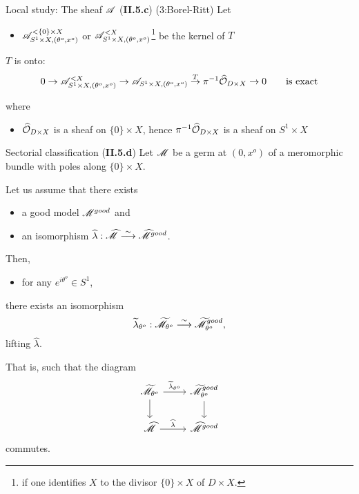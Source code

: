\begin{frame}[t]{Local study: The sheaf $\mathscr{A}$ (\textbf{II.5.c}) (3:Borel-Ritt)}
  Let
  \begin{itemize}
    \item $\mathscr{A}_{S^1\times X,(\theta^o,x^o)}^{<\{0\}\times X}$ or
      $\mathscr{A}_{S^1\times X,(\theta^o,x^o)}^{<X}$\footnote{if one identifies $X$ to
      the divisor $\{0\}\times X$ of $D\times X$.} be the kernel of $T$
  \end{itemize}
  \begin{lem}
    $T$ is onto:
    \[
      0 \to              \mathscr{A}_{S^1\times X,(\theta^o,x^o)}^{<X}
        \to              \mathscr{A}_{S^1\times X,(\theta^o,x^o)}
        \overset{T}{\to} \pi^{-1}\widehat{\mathcal{O}}_{D\times X}
        \to 0
        \qquad
        \text{is exact}
    \]
  \end{lem}
  where
  \begin{itemize}
    \item $\widehat{\mathcal{O}}_{D\times X}$ is a sheaf on $\{0\}\times X$, hence
      $\pi^{-1}\widehat{\mathcal{O}}_{D\times X}$ is a sheaf on $S^1\times X$
  \end{itemize}
\end{frame}

\begin{frame}[fragile]{Sectorial classification (\textbf{II.5.d})}
  Let $\mathscr{M}$ be a germ at $(0,x^o)$ of a meromorphic bundle with poles along
  $\{0\}\times X$.
  \begin{thm}[II.5.12]
    Let us assume that there exists
    \begin{itemize}
      \item a good model $\mathscr{M}^{good}$ and
      \item an isomorphism $\widehat\lambda: \widehat{\mathscr{M}}
        \overset{\sim}{\longrightarrow}\widehat{\mathscr{M}}^{good}$.
    \end{itemize}
    Then,
    \begin{itemize}
      \item for any $e^{i\theta^o}\in S^1$,
    \end{itemize}
    there exists an isomorphism
    \[
      \widetilde\lambda_{\theta^o}: \widetilde{\mathscr{M}}_{\theta^o}
      \overset{\sim}{\longrightarrow}\widetilde{\mathscr{M}}^{good}_{\theta^o},
    \]
    lifting $\hat\lambda$.
  \end{thm}
  That is, such that the diagram
  \[ \begin{tikzcd}
      \tilde\sM_{\theta^o} \dar \rar{\tilde\lambda_{\theta^o}} &
        \tilde\sM^{good}_{\theta^o} \dar
        \\\hat\sM \rar{\hat\lambda} &
        \hat\sM^{good}
  \end{tikzcd} \]
  commutes.
\end{frame}

